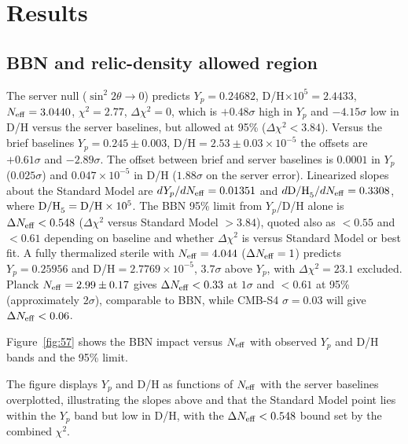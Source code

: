 \documentclass[11pt,a4paper]{article}
\begin{document}
\section{Results}
\subsection{BBN and relic-density allowed region}
The server null ($\sin^{2}2\theta\to0$) predicts $Y_{p}=0.24682$, D/H$\times10^{5}=2.4433$, $N_{\rm eff}=3.0440$, $\chi^{2}=2.77$, $\Delta\chi^{2}=0$, which is $+0.48\sigma$ high in $Y_{p}$ and $-4.15\sigma$ low in D/H versus the server baselines, but allowed at 95\% ($\Delta\chi^{2}<3.84$). Versus the brief baselines $Y_{p}=0.245\pm0.003$, D/H$=2.53\pm0.03\times10^{-5}$ the offsets are $+0.61\sigma$ and $-2.89\sigma$. The offset between brief and server baselines is $0.0001$ in $Y_{p}$ ($0.025\sigma$) and $0.047\times10^{-5}$ in D/H ($1.88\sigma$ on the server error). Linearized slopes about the Standard Model are $dY_{p}/dN_{\rm eff}=0.01351$ and $d{\rm D/H}_{5}/dN_{\rm eff}=0.3308$, where ${\rm D/H}_{5}={\rm D/H}\times10^{5}$. The BBN 95\% limit from $Y_{p}$/D/H alone is $\Delta N_{\rm eff}<0.548$ ($\Delta\chi^{2}$ versus Standard Model $>3.84$), quoted also as $<0.55$ and $<0.61$ depending on baseline and whether $\Delta\chi^{2}$ is versus Standard Model or best fit. A fully thermalized sterile with $N_{\rm eff}=4.044$ ($\Delta N_{\rm eff}=1$) predicts $Y_{p}=0.25956$ and D/H$=2.7769\times10^{-5}$, $3.7\sigma$ above $Y_{p}$, with $\Delta\chi^{2}=23.1$ excluded. Planck $N_{\rm eff}=2.99\pm0.17$ gives $\Delta N_{\rm eff}<0.33$ at $1\sigma$ and $<0.61$ at 95\% (approximately $2\sigma$), comparable to BBN, while CMB-S4 $\sigma=0.03$ will give $\Delta N_{\rm eff}<0.06$.

Figure~\ref{fig:57} shows the BBN impact versus $N_{\rm eff}$ with observed $Y_{p}$ and D/H bands and the 95\% limit.






The figure displays $Y_{p}$ and D/H as functions of $N_{\rm eff}$ with the server baselines overplotted, illustrating the slopes above and that the Standard Model point lies within the $Y_{p}$ band but low in D/H, with the $\Delta N_{\rm eff}<0.548$ bound set by the combined $\chi^{2}$.
\end{document}
